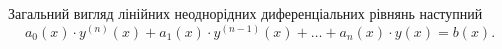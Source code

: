 Загальний вигляд лінійних неоднорідних диференціальних рівнянь наступний
\begin{equation*}
	a_0(x) \cdot y^{(n)}(x) + a_1(x) \cdot y^{(n - 1)}(x) + \ldots + a_n(x) \cdot y(x) = b(x).
\end{equation*}